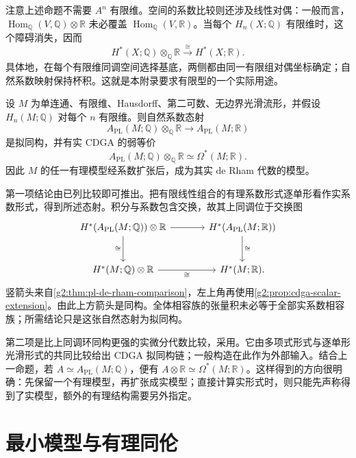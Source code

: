 注意上述命题不需要 \(A^n\) 有限维。空间的系数比较则还涉及线性对偶：一般而言，\(\operatorname{Hom}_{\mathbb Q}(V,\mathbb Q)\otimes\mathbb R\) 未必覆盖 \(\operatorname{Hom}_{\mathbb Q}(V,\mathbb R)\)。当每个 \(H_n(X;\mathbb Q)\) 有限维时，这个障碍消失，因而
\[
	H^*(X;\mathbb Q)\otimes_{\mathbb Q}\mathbb R\xrightarrow{\cong}H^*(X;\mathbb R).
\]
具体地，在每个有限维同调空间选择基底，两侧都由同一有限组对偶坐标确定；自然系数映射保持杯积。这就是本附录要求有限型的一个实际用途。

\begin{theorem}\label{g2:thm:rational-real-model-comparison}
	设 \(M\) 为单连通、有限维、Hausdorff、第二可数、无边界光滑流形，并假设 \(H_n(M;\mathbb Q)\) 对每个 \(n\) 有限维。则自然系数态射
	\[
		A_{\mathrm{PL}}(M;\mathbb Q)\otimes_{\mathbb Q}\mathbb R
		\longrightarrow A_{\mathrm{PL}}(M;\mathbb R)
	\]
	是拟同构，并有实 CDGA 的弱等价
	\[
		A_{\mathrm{PL}}(M;\mathbb Q)\otimes_{\mathbb Q}\mathbb R
		\simeq\Omega^*(M;\mathbb R).
	\]
	因此 \(M\) 的任一有理模型经系数扩张后，成为其实 de Rham 代数的模型。
\end{theorem}

第一项结论由已列比较即可推出。把有限线性组合的有理系数形式逐单形看作实系数形式，得到所述态射。积分与系数包含交换，故其上同调位于交换图
\[
	\begin{tikzcd}[column sep=large,row sep=large]
		H^*(A_{\mathrm{PL}}(M;\mathbb Q))\otimes\mathbb R \arrow[r] \arrow[d,"\cong"'] & H^*(A_{\mathrm{PL}}(M;\mathbb R)) \arrow[d,"\cong"] \\
		H^*(M;\mathbb Q)\otimes\mathbb R \arrow[r,"\cong"'] & H^*(M;\mathbb R).
	\end{tikzcd}
\]
竖箭头来自\cref{g2:thm:pl-de-rham-comparison}，左上角再使用\cref{g2:prop:cdga-scalar-extension}。由此上方箭头是同构。全体相容族的张量积未必等于全部实系数相容族；所需结论只是这张自然态射为拟同构。

\ProseParagraphBreak

第二项是比上同调环同构更强的实微分代数比较，采用\cite[第2节，第17页，第2项比较]{FelixHalperin2017SullivanModels}。它由多项式形式与逐单形光滑形式的共同比较给出 CDGA 拟同构链；一般构造在此作为外部输入。结合上一命题，若 \(A\simeq A_{\mathrm{PL}}(M;\mathbb Q)\)，便有 \(A\otimes\mathbb R\simeq\Omega^*(M;\mathbb R)\)。这样得到的方向很明确：先保留一个有理模型，再扩张成实模型；直接计算实形式时，则只能先声称得到了实模型，额外的有理结构需要另外指定。

\section{最小模型与有理同伦}
\label{g2:sec:E02}

